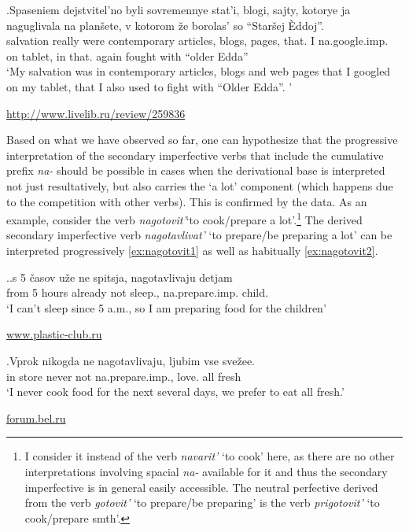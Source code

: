 \exg.\label{ex:naguglivat}Spaseniem dejstvitel'no byli sovremennye stat'i, blogi, sajty, kotorye ja naguglivala na plan\v{s}ete, v kotorom \v{z}e borolas' so ``Star\v{s}ej \`{E}ddoj''.\\
salvation really were contemporary articles, blogs, pages, that. I na.google.imp. on tablet, in that. again fought with ``older Edda''\\
\vspace{0.5em}
`My salvation was in contemporary articles, blogs and web pages that I googled on my tablet, that I also used to fight with ``Older Edda''. '
\begin{flushright}
\vspace{-0.5em}
\url{http://www.livelib.ru/review/259836}
\end{flushright}

Based on what we have observed so far, one can hypothesize that the progressive interpretation of the secondary imperfective verbs that include the cumulative prefix \textit{na-} should be possible in cases when the derivational base is interpreted not just resultatively, but also carries the `a lot' component (which happens due to the competition with other verbs). This is confirmed by the data. As an example, consider the verb \textit{nagotovit'}`to cook/prepare a lot'.\footnote{I consider it instead of the verb \textit{navarit'} `to cook' here, as there are no other interpretations involving spacial \textit{na-} available for it and thus the secondary imperfective is in general easily accessible. The neutral perfective derived from the verb \textit{gotovit'} `to prepare/be preparing' is the verb \textit{prigotovit'} `to cook/prepare smth'.}  The derived secondary imperfective verb \textit{nagotavlivat'} `to prepare/be preparing a lot' can be interpreted progressively \ref{ex:nagotovit1} as well as habitually \ref{ex:nagotovit2}.

\ex.\label{ex:nagotovit}\ag.\label{ex:nagotovit1}s 5 \v{c}asov u\v{z}e ne spitsja, nagotavlivaju detjam\\
from 5 hours already not sleep., na.prepare.imp. child.\\
\vspace{0.5em}
`I can't sleep since 5 a.m., so I am preparing food for the children'
\begin{flushright}
\vspace{-0.5em}
\url{www.plastic-club.ru}
\end{flushright}
\bg.\label{ex:nagotovit2}Vprok nikogda ne nagotavlivaju, ljubim vse sve\v{z}ee.\\
{in store} never not na.prepare.imp., love. all fresh\\
\vspace{0.5em}
`I never cook food for the next several days, we prefer to eat all fresh.'
\begin{flushright}
\vspace{-0.5em}
\url{forum.bel.ru}
\end{flushright}

